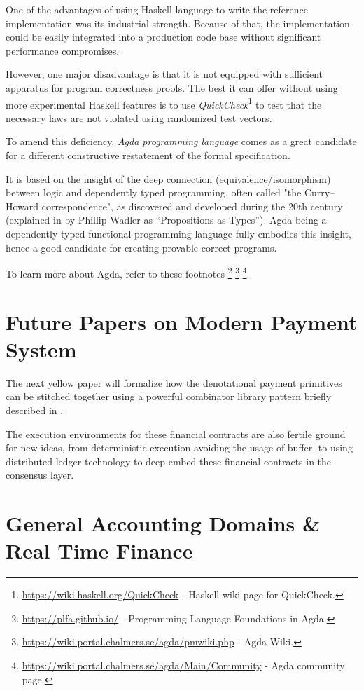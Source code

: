 One of the advantages of using Haskell language to write the reference implementation was its
industrial strength. Because of that, the implementation could be easily integrated into a
production code base without significant performance compromises.

However, one major disadvantage is that it is not equipped with sufficient apparatus for program
correctness proofs. The best it can offer without using more experimental Haskell features is to
use \textit{QuickCheck}\footnote{\url{https://wiki.haskell.org/QuickCheck} - Haskell wiki page for
QuickCheck.} to test that the necessary laws are not violated using randomized test vectors.

To amend this deficiency, \textit{Agda programming language} comes as a great candidate for a
different constructive restatement of the formal specification.

It is based on the insight of the deep connection (equivalence/isomorphism) between logic and
dependently typed programming, often called "the Curry–Howard correspondence", as discovered and
developed during the 20th century (explained in \cite{wadler2015propositions} by Phillip Wadler as
``Propositions as Types''). Agda being a dependently typed functional programming language fully
embodies this insight, hence a good candidate for creating provable correct programs.

To learn more about Agda, refer to these footnotes
\footnote{\url{https://plfa.github.io/} - Programming Language Foundations in Agda.}
\footnote{\url{https://wiki.portal.chalmers.se/agda/pmwiki.php} - Agda Wiki.}
\footnote{\url{https://wiki.portal.chalmers.se/agda/Main/Community} - Agda community page.}.

\section{Future Papers on Modern Payment System}

The next yellow paper will formalize how the denotational payment primitives can be stitched
together using a powerful combinator library pattern briefly described
in \cite{peyton2000composing}.

The execution environments for these financial contracts are also fertile ground for new ideas, from
deterministic execution avoiding the usage of buffer, to using distributed ledger technology to
deep-embed these financial contracts in the consensus layer.

\section{General Accounting Domains \& Real Time Finance}

